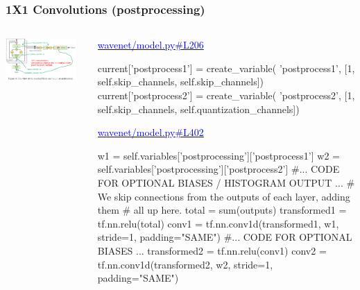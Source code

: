 \documentclass[8pt]{beamer}
\begin{document}
\begin{frame}[fragile]
\frametitle{1X1 Convolutions (postprocessing)}
\begin{columns}
\begin{column}{0.5\textwidth}
 
\includegraphics[width=0.9\textwidth]{./dl3_images/1x1_convolutions_3.png}

\end{column}
\begin{column}{0.5\textwidth}
 
 \href{https://github.com/ibab/tensorflow-wavenet/blob/master/wavenet/model.py\#L206}{\textcolor{blue}{wavenet/model.py\#L206}}
 
\begin{verbnobox}[\tiny]
    current['postprocess1'] = create_variable(
        'postprocess1',
        [1, self.skip_channels, self.skip_channels])
    current['postprocess2'] = create_variable(
        'postprocess2',
        [1, self.skip_channels, self.quantization_channels])
\end{verbnobox}

 \href{https://github.com/ibab/tensorflow-wavenet/blob/master/wavenet/model.py\#L402}{\textcolor{blue}{wavenet/model.py\#L402}}
 
 \begin{verbnobox}[\tiny]
    w1 = self.variables['postprocessing']['postprocess1']
    w2 = self.variables['postprocessing']['postprocess2']
        #... CODE FOR OPTIONAL BIASES / HISTOGRAM OUTPUT ...
    # We skip connections from the outputs of each layer, adding them
    # all up here.
    total = sum(outputs)
    transformed1 = tf.nn.relu(total)
    conv1 = tf.nn.conv1d(transformed1, w1, stride=1, padding="SAME")
        #... CODE FOR OPTIONAL BIASES ...
    transformed2 = tf.nn.relu(conv1)
    conv2 = tf.nn.conv1d(transformed2, w2, stride=1, padding="SAME")
\end{verbnobox}

\end{column}
\end{columns} 
 
\end{frame}
\end{document}
